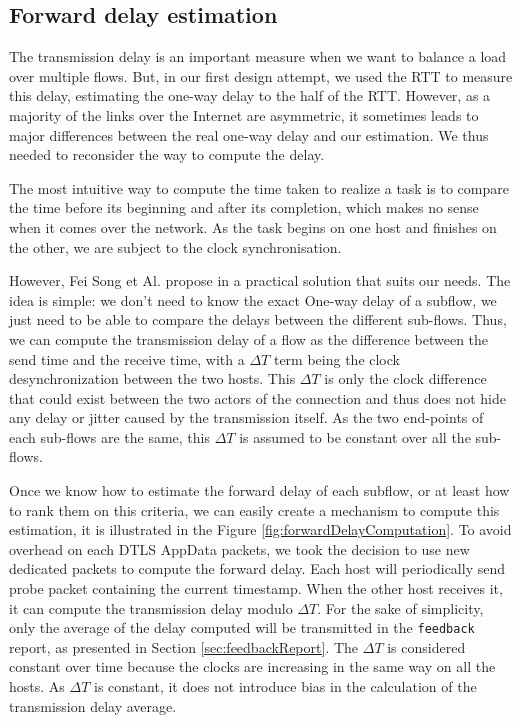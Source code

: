 \subsection{Forward delay estimation}
The transmission delay is an important measure when we want to balance a load over multiple flows. But, in our first design attempt, we used the RTT to measure this delay, estimating the one-way delay to the half of the RTT. However, as a majority of the links over the Internet are asymmetric, it sometimes leads to major differences between the real one-way delay and our estimation. We thus needed to reconsider the way to compute the delay.

The most intuitive way to compute the time taken to realize a task is to compare the time before its beginning and after its completion, which makes no sense when it comes over the network. As the task begins on one host and finishes on the other, we are subject to the clock synchronisation.

However, Fei Song et Al. propose in \cite{song2009estimator} a practical solution that suits our needs. The idea is simple: we don't need to know the exact One-way delay of a subflow, we just need to be able to compare the delays between the different sub-flows. Thus, we can compute the transmission delay of a flow as the difference between the send time and the receive time, with a $\Delta T$ term being the clock desynchronization between the two hosts. This $\Delta T$ is only the clock difference that could exist between the two actors of the connection and thus does not hide any delay or jitter caused by the transmission itself. As the two end-points of each sub-flows are the same, this $\Delta T$ is assumed to be constant over all the sub-flows.

Once we know how to estimate the forward delay of each subflow, or at least how to rank them on this criteria, we can easily create a mechanism to compute this estimation, it is illustrated in the Figure \ref{fig:forwardDelayComputation}. To avoid overhead on each DTLS AppData packets, we took the decision to use new dedicated packets to compute the forward delay. Each host will periodically send probe packet containing the current timestamp. When the other host receives it, it can compute the transmission delay modulo $\Delta T$. For the sake of simplicity, only the average of the delay computed will be transmitted in the \verb!feedback! report, as presented in Section \ref{sec:feedbackReport}. The $\Delta T$ is considered constant over time because the clocks are increasing in the same way on all the hosts. As $\Delta T$ is constant, it does not introduce bias in the calculation of the transmission delay average. 

